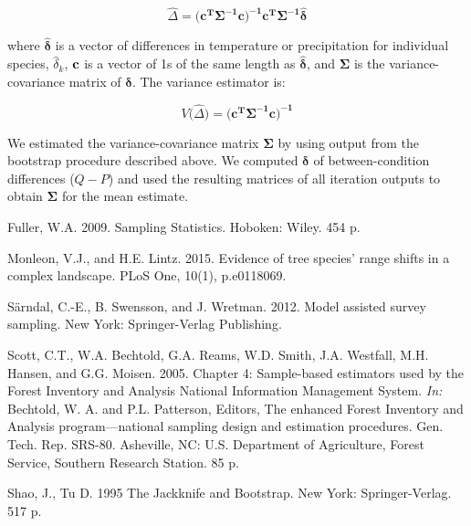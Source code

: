 \documentclass[12pt]{article}
\begin{document}
 \begin{equation} \label{eq:gls}
\hat{\Delta} = \big(\mathbf{c^T\Sigma^{-1}c\big)^{-1}c^T\Sigma^{-1}}\hat{\boldsymbol{\delta}}
\end{equation}

where $\hat{\boldsymbol{\delta}}$ is a vector of differences in temperature or precipitation for individual species, $\hat{\delta}_k$, $\bold{c}$ is a vector of 1s of the same length as $\hat{\boldsymbol{\delta}}$, and $\mathbf{\Sigma}$ is the variance-covariance matrix of $\boldsymbol{\delta}$.  The variance estimator is: 

 \begin{equation} \label{eq:glsV}
V\big(\hat{\Delta}\big) = \big(\mathbf{c^T\Sigma^{-1}c\big)^{-1}}
\end{equation}

We estimated the variance-covariance matrix $\mathbf{\Sigma}$ by using output from the bootstrap procedure described above.  We computed $\boldsymbol{\delta}$ of between-condition differences ($Q - P$) and used the resulting matrices of all iteration outputs to obtain $\mathbf{\Sigma}$ for the mean estimate. 

\begin{thebibliography}{2}



 Fuller, W.A.  2009.  Sampling Statistics. Hoboken: Wiley. 454 p.

 Monleon, V.J., and H.E. Lintz.  2015. Evidence of tree species’ range shifts in a complex landscape. PLoS One, 10(1), p.e0118069.

 S{\"a}rndal, C.-E., B. Swensson, and J. Wretman.  2012.  Model assisted survey sampling.  New York: Springer-Verlag Publishing.

 Scott, C.T., W.A. Bechtold, G.A. Reams, W.D. Smith, J.A. Westfall, M.H. Hansen, and G.G. Moisen.  2005.  Chapter 4: Sample-based estimators used by the Forest Inventory and Analysis National Information Management System.  \emph{In:} Bechtold, W. A. and P.L. Patterson, Editors, The enhanced Forest Inventory and Analysis program—national sampling design and estimation procedures. Gen. Tech. Rep. SRS-80. Asheville, NC: U.S. Department of Agriculture, Forest Service, Southern Research Station. 85 p.

 Shao, J., Tu D. 1995 The Jackknife and Bootstrap. New York: Springer-Verlag. 517 p.

\end{thebibliography}
\end{document}
